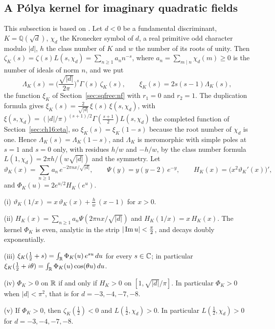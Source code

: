 \subsection{A P\'olya kernel for imaginary quadratic fields}\label{sec:sqfree:quad}

This subsection is based on \cite{P26sqf}. Let $d<0$ be a fundamental discriminant, $K=\mathbb Q(\sqrt d)$, $\chi_d$ the Kronecker symbol of $d$, a real primitive odd character modulo $|d|$, $h$ the class number of $K$ and $w$ the number of its roots of unity. Then $\zeta_K(s)=\zeta(s)L(s,\chi_d)=\sum_{n\ge1}a_nn^{-s}$, where $a_n=\sum_{m\mid n}\chi_d(m)\ge0$ is the number of ideals of norm $n$, and we put
\[
\Lambda_K(s)=\Big(\frac{\sqrt{|d|}}{2\pi}\Big)^s\Gamma(s)\,\zeta_K(s),\qquad \xi_K(s)=2s(s-1)\Lambda_K(s),
\]
the function $\xi_K$ of Section~\ref{sec:sqfree:nf} with $r_1=0$ and $r_2=1$. The duplication formula gives $\xi_K(s)=\frac2{\sqrt{|d|}}\,\xi(s)\,\xi(s,\chi_d)$, with $\xi(s,\chi_d)=(|d|/\pi)^{(s+1)/2}\Gamma(\frac{s+1}2)L(s,\chi_d)$ the completed function of Section~\ref{sec:ch16:eta}, so $\xi_K(s)=\xi_K(1-s)$ because the root number of $\chi_d$ is one. Hence $\Lambda_K(s)=\Lambda_K(1-s)$, and $\Lambda_K$ is meromorphic with simple poles at $s=1$ and $s=0$ only, with residues $h/w$ and $-h/w$, by the class number formula $L(1,\chi_d)=2\pi h/(w\sqrt{|d|})$ and the symmetry. Let
\[
\vartheta_K(x)=\sum_{n\ge1}a_n\,e^{-2\pi nx/\sqrt{|d|}},\qquad \Psi(y)=y(y-2)\,e^{-y},\qquad H_K(x)=\big(x^2\vartheta_K'(x)\big)',
\]
and $\Phi_K(u)=2e^{u/2}H_K(e^u)$.

\begin{theorem}\label{thm:sqfree:kernelK}
\textup{(i)} $\vartheta_K(1/x)=x\,\vartheta_K(x)+\frac hw\,(x-1)$ for $x>0$.

\textup{(ii)} $H_K(x)=\sum_{n\ge1}a_n\Psi(2\pi nx/\sqrt{|d|})$ and $H_K(1/x)=x\,H_K(x)$. The kernel $\Phi_K$ is even, analytic in the strip $|\operatorname{Im} u|<\frac\pi2$, and decays doubly exponentially.

\textup{(iii)} $\xi_K(\frac12+s)=\int_{\mathbb{R}}\Phi_K(u)\,e^{su}\,du$ for every $s\in\mathbb{C}$; in particular $\xi_K(\frac12+i\theta)=\int_{\mathbb{R}}\Phi_K(u)\cos(\theta u)\,du$.

\textup{(iv)} $\Phi_K>0$ on $\mathbb{R}$ if and only if $H_K>0$ on $[1,\sqrt{|d|}/\pi]$. In particular $\Phi_K>0$ when $|d|<\pi^2$, that is for $d=-3,-4,-7,-8$.

\textup{(v)} If $\Phi_K>0$, then $\zeta_K(\frac12)<0$ and $L(\frac12,\chi_d)>0$. In particular $L(\frac12,\chi_d)>0$ for $d=-3,-4,-7,-8$.
\end{theorem}

